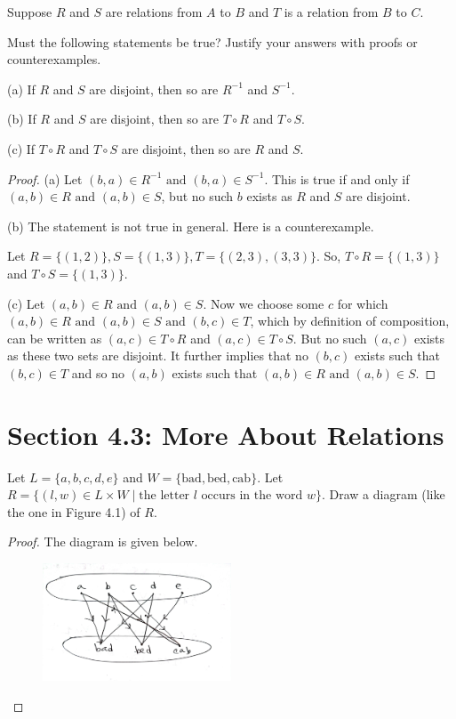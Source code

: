 \documentclass[12pt]{article}
\newenvironment{exercise}[2][Exercise]{\begin{trivlist}
\item[\hskip \labelsep {\bfseries #1}\hskip \labelsep {\bfseries #2.}]}{\end{trivlist}}
\newcommand{\nd}{\text{ and }}
\begin{document}
\begin{exercise}
	{13}
	Suppose \( R \) and \( S \) are relations from \( A \) to \( B \) and \( T \) is a relation from \( B \) to \( C \).

Must the following statements be true? Justify your answers with proofs or counterexamples.

(a) If \( R \) and \( S \) are disjoint, then so are \( R^{-1} \) and \( S^{-1} \).

(b) If \( R \) and \( S \) are disjoint, then so are \( T \circ R \) and \( T \circ S \).

(c) If \( T \circ R \) and \( T \circ S \) are disjoint, then so are \( R \) and \( S \).
\end{exercise}

\begin{proof}
	(a) Let $(b,a)\in R^{-1} \nd (b,a)\in S^{-1}$. This is true if and only if $(a,b)\in R \nd (a,b)\in S$, but no such $b$ exists as $R$ and $S$ are disjoint.

	(b) The statement is not true in general. Here is a counterexample.
	
	Let $R=\{(1,2)\}, S=\{(1,3)\}, T=\{(2,3),(3,3)\}$. So, $T\circ R=\{(1,3)\}$ and $T\circ S=\{(1,3)\}$.

	(c) Let $(a,b)\in R \nd (a,b)\in S$. Now we choose some $c$ for which $(a,b)\in R \nd (a,b)\in S \nd (b,c)\in T$, which by definition of composition, can be written as $(a,c)\in T\circ R$ and $(a,c)\in T\circ S$. But no such $(a,c)$ exists as these two sets are disjoint. It further implies that no $(b,c)$ exists such that $(b,c)\in T$ and so no $(a,b)$ exists such that $(a,b)\in R\nd (a,b)\in S$.   
\end{proof}

\section{Section 4.3: More About Relations}

\begin{exercise}
	{1}
	Let \( L = \{a, b, c, d, e\} \) and \( W = \{\text{bad}, \text{bed}, \text{cab}\} \). Let 
\( R = \{(l, w) \in L \times W \mid \text{the letter } l \text{ occurs in the word } w\} \). Draw a diagram (like the one in Figure 4.1) of \( R \).
\end{exercise}

\begin{proof}
	The diagram is given below.
	\begin{figure}[H]
		\centering
		\includegraphics[width=0.5\textwidth]{sol1.jpg}
	\end{figure}
\end{proof}
\end{document}
